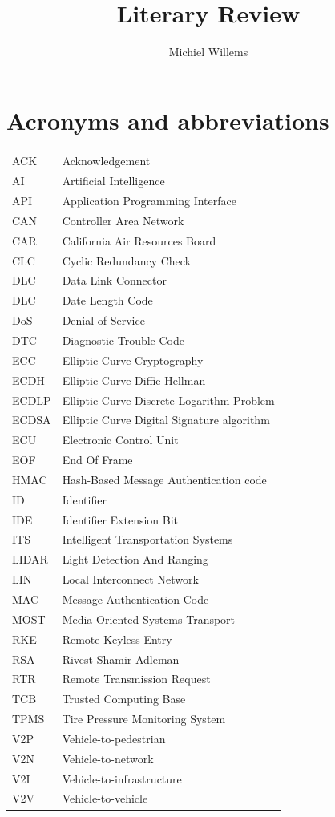 \documentclass[11pt]{article}
\title{Literary Review}
\author{Michiel Willems}
\begin{document}
	


\section{Acronyms and abbreviations}
\begin{tabular}{ l l }
	ACK & Acknowledgement \\
	AI & Artificial Intelligence \\
	API & Application Programming Interface \\
	CAN & Controller Area Network \\
	CAR & California Air Resources Board \\
	CLC & Cyclic Redundancy Check \\
	DLC & Data Link Connector \\
	DLC & Date Length Code \\
	DoS & Denial of Service \\
	DTC & Diagnostic Trouble Code \\
	ECC & Elliptic Curve Cryptography \\
	ECDH & Elliptic Curve Diffie-Hellman \\
	ECDLP & Elliptic Curve Discrete Logarithm Problem \\
	ECDSA & Elliptic Curve Digital Signature algorithm \\
	ECU & Electronic Control Unit \\
	EOF & End Of Frame \\
	HMAC & Hash-Based Message Authentication code \\
	ID & Identifier \\
	IDE & Identifier Extension Bit \\
	ITS & Intelligent Transportation Systems \\
	LIDAR & Light Detection And Ranging \\
	LIN & Local Interconnect Network \\
	MAC & Message Authentication Code \\
	MOST & Media Oriented Systems Transport \\
	RKE & Remote Keyless Entry \\
	RSA & Rivest-Shamir-Adleman \\
	RTR & Remote Transmission Request \\
	TCB & Trusted Computing Base \\
	TPMS & Tire Pressure Monitoring System \\
	V2P & Vehicle-to-pedestrian \\
	V2N & Vehicle-to-network \\
	V2I & Vehicle-to-infrastructure  \\
	V2V & Vehicle-to-vehicle \\
\end{tabular}
\end{document}
